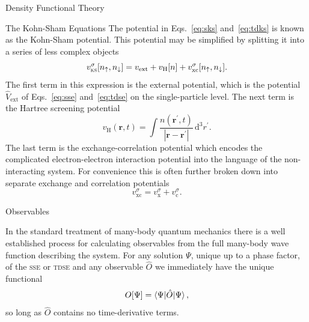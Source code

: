 \documentclass[letterpaper, 11 pt]{report}
\begin{document}
\begin{chapter}{Density Functional Theory \label{chap:dft}}
\begin{section}{The Kohn-Sham Equations \label{sec:ks}}
      The potential in Eqs.~\eqref{eq:sks} and~\eqref{eq:tdks} is known as the Kohn-Sham potential. This
      potential may be simplified by splitting it into a series of less complex objects
      \begin{equation} \label{eq:vks}
         v^\sigma_\mathrm{\textsc{ks}}[n_\uparrow, n_\downarrow] = v_\mathrm{ext} + v_\mathrm{H}[n]
            + v^\sigma_\mathrm{xc}[n_\uparrow, n_\downarrow].
      \end{equation}
      The first term in this expression is the external potential, which is the potential
      $\hat{V}_\mathrm{ext}$ of Eqs.~\eqref{eq:sse} and~\eqref{eq:tdse} on the single-particle level.
      The next term is the Hartree screening potential
      \begin{equation} \label{eq:vh}
         v_\mathrm{H}(\mathbf{r},t) = \int \frac{n(\mathbf{r}^\prime, t)}
            {\left| \mathbf{r} - \mathbf{r}^\prime\right|} \, \mathrm{d}^3 r^\prime.
      \end{equation}
      The last term is the exchange-correlation potential which encodes the complicated
      electron-electron interaction potential into the language of the non-interacting system. For
      convenience this is often further broken down into separate exchange and correlation potentials
      \begin{equation} \label{eq:vxc}
         v^\sigma_\mathrm{xc} = v^\sigma_\mathrm{x} + v^\sigma_\mathrm{c}.
      \end{equation}

   \end{section}

   \begin{section}{Observables \label{sec:obs}}

      In the standard treatment of many-body quantum mechanics there is a well established process for
      calculating observables from the full many-body wave function describing the system. For any
      solution $\Psi$, unique up to a phase factor, of the \textsc{sse} or \textsc{tdse} and any
      observable $\hat{O}$ we immediately have the unique functional
      \begin{equation} \label{eq:obsfunc1}
         O[\Psi] = \braket{\Psi| \hat{O} | \Psi},
      \end{equation}
      so long as $\hat{O}$ contains no time-derivative terms.


\end{section}
\end{chapter}
\end{document}
